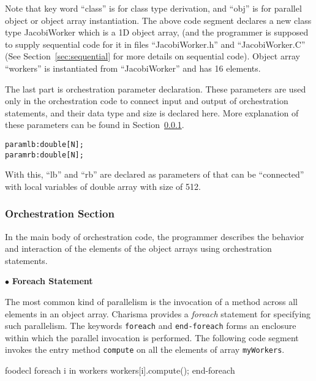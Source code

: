 \documentclass[10pt]{article}
\def\smallfbox#1{{\small {\fbox{#1}}}}
\def\code#1{{\small {\tt {#1}}}}
\begin{document}
Note that key word ``class'' is for class type derivation, and ``obj'' is for
parallel object or object array instantiation. The above code segment declares a
new class type JacobiWorker which is a 1D object array, (and the programmer is
supposed to supply sequential code for it in files ``JacobiWorker.h'' and
``JacobiWorker.C'' (See Section~\ref{sec:sequential} for more details on
sequential code). Object array ``workers'' is instantiated from ``JacobiWorker''
and has 16 elements.

The last part is orchestration parameter declaration. These parameters are used
only in the orchestration code to connect input and output of orchestration
statements, and their data type and size is declared here. More explanation of
these parameters can be found in Section~\ref{sec:orchsec}. 

\begin{alltt}
    param lb : double[N];
    param rb : double[N];
\end{alltt}

With this, ``lb'' and ``rb'' are declared as parameters of that can be 
``connected'' with local variables of double array with size of 512. 

\subsubsection{Orchestration Section}
\label{sec:orchsec}

In the main body of orchestration code, the programmer describes the behavior
and interaction of the elements of the object arrays using orchestration
statements.

$\bullet$ {\bf Foreach Statement}

The most common kind of parallelism is the invocation of a method
across all elements in an object array. Charisma provides a {\em foreach}
statement for specifying such parallelism. The keywords \code{foreach} and
\code{end-foreach} forms an enclosure within which the parallel invocation is
performed. The following code segment invokes the entry method \code{compute} on
all the elements of array \code{myWorkers}. 

\begin{SaveVerbatim}{foodecl}
  foreach i in workers
    workers[i].compute();
  end-foreach
\end{SaveVerbatim}
\vspace{0.1in}
\smallfbox{\BUseVerbatim{foodecl}}
\vspace{0.1in}
\end{document}
